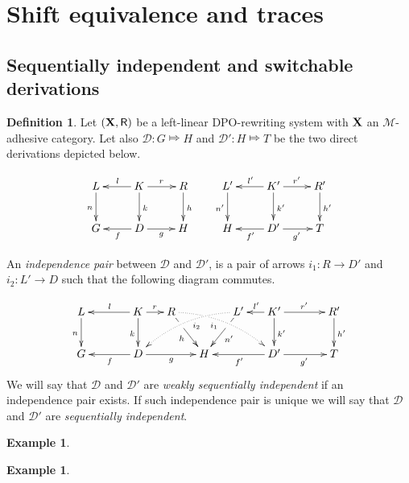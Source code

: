 \documentclass[a4paper]{article}
\def\R{\mathsf{R}}
\def\X{\textbf {\textup{X}}}
\newcommand{\dder}[1]{\mathscr{#1}}
\theoremstyle{definition}
\newtheorem{definition}[theorem]{Definition}
\newtheorem{example}[theorem]{Example}
\begin{document}
\section{Shift equivalence and traces}

\subsection{Sequentially independent and switchable derivations}

\begin{definition}  Let $(\X, \R)$ be a left-linear DPO-rewriting system with $\X$ an $\mathcal{M}$-adhesive category. Let also $\dder{D}\colon G\Mapsto H$ and $\dder{D'}\colon H\Mapsto T$ be the two direct derivations depicted below.

\[\xymatrix{L \ar[d]_{n}& K \ar[d]^{k}\ar[l]_{l} \ar[r]^{r} & R \ar[d]^{h} & L' \ar[d]_{n'}& K' \ar[d]^{k'}\ar[l]_{l'} \ar[r]^{r'} & R' \ar[d]^{h'}\\G & \ar[l]^{f} D \ar[r]_{g}& H & H & \ar[l]^{f'} D' \ar[r]_{g'}& T}\]

An \emph{independence pair} between $\dder{D}$ and $\dder{D'}$, is a pair of  arrows $i_1\colon R\to D'$ and $i_2\colon L'\to D$ such that the following diagram commutes.

\[\xymatrix@C=15pt{L \ar[d]_{n}&& K \ar[d]_{k}\ar[ll]_{l} \ar[r]^{r} & R \ar@/^.35cm/@{.>}[drrr]|(.3)\hole_(.4){i_1} \ar[dr]|(.3)\hole_{h} && L' \ar@/_.35cm/@{.>}[dlll]^(.4){i_2} \ar[dl]|(.3)\hole^{n'}& K' \ar[d]^{k'}\ar[l]_{l'} \ar[rr]^{r'} && R' \ar[d]^{h'}\\G && \ar[ll]^{f} D \ar[rr]_{g}&& H  && \ar[ll]^{f'} D' \ar[rr]_{g'}&& T}\]
We will say that $\dder{D}$ and $\dder{D'}$ are \emph{weakly sequentially independent} if an independence pair exists. If such independence pair is unique we will say that $\dder{D}$ and $\dder{D'}$ are \emph{sequentially independent}.
\end{definition}

\begin{example}
\end{example}
\begin{example}
\end{example}
\end{document}
